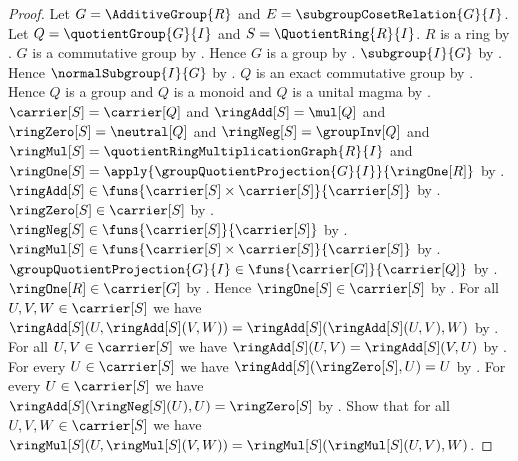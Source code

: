 \begin{proof}
    Let $G=\AdditiveGroup{R}$ and $E=\subgroupCosetRelation{G}{I}$.
    Let $Q=\quotientGroup{G}{I}$ and $S=\QuotientRing{R}{I}$.
    $R$ is a ring by .
    $G$ is a commutative group by
        .
    Hence $G$ is a group by .
    $\subgroup{I}{G}$ by
        .
    Hence $\normalSubgroup{I}{G}$ by
        .
    $Q$ is an exact commutative group by
        .
    Hence $Q$ is a group and $Q$ is a monoid and
        $Q$ is a unital magma by
        .
    $\carrier[S]=\carrier[Q]$ and
        $\ringAdd[S]=\mul[Q]$ and
        $\ringZero[S]=\neutral[Q]$ and
        $\ringNeg[S]=\groupInv[Q]$ and
        $\ringMul[S]=\quotientRingMultiplicationGraph{R}{I}$ and
        $\ringOne[S]
            =\apply{\groupQuotientProjection{G}{I}}{\ringOne[R]}$ by
        .
    $\ringAdd[S]\in
        \funs{\carrier[S]\times\carrier[S]}{\carrier[S]}$ by
        .
    $\ringZero[S]\in\carrier[S]$ by .
    $\ringNeg[S]\in\funs{\carrier[S]}{\carrier[S]}$ by
        .
    $\ringMul[S]\in
        \funs{\carrier[S]\times\carrier[S]}{\carrier[S]}$ by
        .
    $\groupQuotientProjection{G}{I}\in
        \funs{\carrier[G]}{\carrier[Q]}$ by
        .
    $\ringOne[R]\in\carrier[G]$ by
        .
    Hence $\ringOne[S]\in\carrier[S]$ by .
    For all $U,V,W\in\carrier[S]$ we have
        $\ringAdd[S](U,\ringAdd[S](V,W))
            =\ringAdd[S](\ringAdd[S](U,V),W)$ by
        .
    For all $U,V\in\carrier[S]$ we have
        $\ringAdd[S](U,V)=\ringAdd[S](V,U)$ by
        .
    For every $U\in\carrier[S]$ we have
        $\ringAdd[S](\ringZero[S],U)=U$ by
        .
    For every $U\in\carrier[S]$ we have
        $\ringAdd[S](\ringNeg[S](U),U)=\ringZero[S]$ by
        .
    Show that for all $U,V,W\in\carrier[S]$ we have
        $\ringMul[S](U,\ringMul[S](V,W))
            =\ringMul[S](\ringMul[S](U,V),W)$.

\end{proof}
